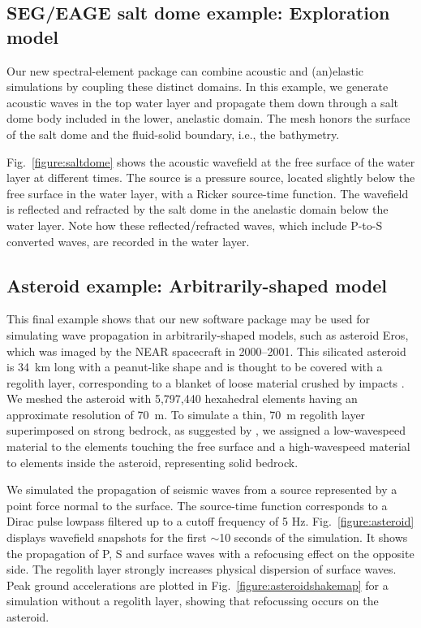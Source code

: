 \documentclass[referee,extra]{gji}
\renewcommand{\cite}[1]{\citet{#1}}
\begin{document}
\subsection{SEG/EAGE salt dome example: Exploration model}\label{subsec:exampleSEG}

Our new spectral-element package can combine acoustic and (an)elastic simulations
by coupling these distinct domains.
In this example, we generate acoustic waves in the top water layer and propagate them
down through a salt dome body included in the lower, anelastic domain.
The mesh honors the surface of the salt dome and the fluid-solid boundary, i.e., the bathymetry.

Fig.~\ref{figure:saltdome} shows the acoustic wavefield at the free surface of the water layer at different times.
The source is a pressure source, located slightly below the free surface in the water layer, with a Ricker source-time function.
The wavefield is reflected and refracted by the salt dome in the anelastic domain below the water layer.
Note how these reflected/refracted waves, which include P-to-S converted waves, are recorded in the water layer.

\subsection{Asteroid example: Arbitrarily-shaped model}\label{subsec:exampleAsteroid}

This final example shows that our new software package may be used for simulating wave propagation in arbitrarily-shaped models, such as asteroid Eros, which was imaged by the NEAR spacecraft in 2000--2001.
This silicated asteroid is 34~km long with a peanut-like shape and is thought to be covered with a regolith layer,
corresponding to a blanket of loose material crushed by impacts \citep{RiMeGrBr05}.
We meshed the asteroid with 5,797,440 hexahedral elements having an approximate resolution of 70~m.
To simulate a thin, 70~m regolith layer superimposed on strong bedrock, as suggested by \cite{RoThVeMuWi02},
we assigned a low-wavespeed material to the elements touching the free surface and a high-wavespeed material to elements inside the asteroid, representing solid bedrock.

We simulated the propagation of seismic waves from a source represented by a point force normal to the surface.
The source-time function corresponds to a Dirac pulse lowpass filtered up to a cutoff frequency of 5 Hz.
Fig.~\ref{figure:asteroid} displays wavefield snapshots for the first $\sim$10 seconds of the simulation. It shows the propagation of P, S and surface waves with a refocusing effect on the opposite side.
The regolith layer strongly increases physical dispersion of  surface waves.
Peak ground accelerations are plotted in Fig.~\ref{figure:asteroidshakemap} for a simulation without a regolith layer,
showing that refocussing occurs on the asteroid.
\end{document}
